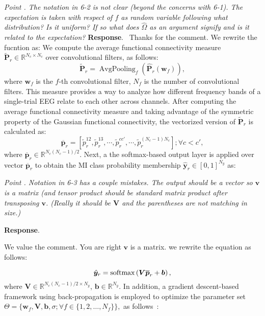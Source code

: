 \documentclass[runningheads]{llncs}
\newcommand{\Real}{\mathbb{R}}
\newcommand{\ve}[1]{\bm {#1}}
\newcommand{\mat}[1]{\bm {#1}}
\newenvironment{reviewer}{\setcounter{pointcounter}{1}}{}
\newcommand{\changes}[1]{\textcolor[rgb]{1.00,0.00,0.00}{#1}}
\newcommand{\point}[1]{\medskip \noindent
 \textsl{{\fontseries{b}\selectfont Point \thepointcounter}.
 \stepcounter{pointcounter} #1}}
\newcommand{\reply}{\medskip \noindent \textbf{Response}.\ }
\begin{document}
\begin{reviewer}
{\point{The notation in 6-2 is not clear (beyond the concerns with 6-1). The expectation is taken with respect of $f$ as random variable following what distribution? Is it uniform? If so what does $\hat{\Omega}$ as an argument signify and is it related to the expectation?}
\reply{
    Thanks for the comment. We rewrite the fucntion as:
    \changes{ We compute the average functional connectivity measure $\tilde{\mat{P}}_r \in \Real^{N_c \times N_c}$ over convolutional filters, as follows:
    \begin{equation}
		\tilde{\mat{P}}_r  = \operatorname{AvgPooling}_{f} \left(\hat{\mat{P}}_{r}(\ve{w}_f)\right), \label{eq:lastlayerFC}
	\end{equation}
    where $\ve{w}_f$ is the $f$-th convolutional filter, $N_f$ is the number of convolutional filters. This measure provides a way to analyze how different frequency bands of a single-trial EEG relate to each other across channels. After computing the average functional connectivity measure and taking advantage of the symmetric property of the Gaussian functional connectivity, the vectorized version of $\tilde{\mat{P}}_r$ is calculated as:
    \begin{equation} 
        \overline{\ve{p}}_r = \left[\tilde{p}_r^{12}, \tilde{p}_r^{13}, \cdots, \tilde{p}_r^{cc'}, \cdots, \tilde{p}_r^{(N_c-1) N_c} \right]; \forall c<c',
    \end{equation}
    where $\overline{\ve{p}}_r \in  \Real ^{N_c(N_c-1)/2}$. Next, a the softmax-based output layer is applied over vector $\overline{\ve{p}}_r$ to obtain the MI class probability membership $\hat{\ve{y}}_r \in [0,1]^{N_y}$ as:
    }
}

\point{Notation in 6-3 has a couple mistakes. The output should be a vector so $\mathbf{v}$ is a matrix (and tensor product should be standard matrix product after transposing $\mathbf{v}$. (Really it should be $\mathbf{V}$ and the parentheses are not matching in size.) }

\reply{
    We value the comment. You are right $\mathbf{v}$ is a matrix. we rewrite the equation as follows:

    \changes{
        \begin{equation}\label{eq:output}
            \hat{\ve{y}}_r = {\rm{softmax}}\left(\mat{V}\overline{\ve{p}}_r + \ve{b}\right),
        \end{equation}
        where $\mat{V}\in \Real^{N_c(N_c-1)/2\times N_y}$, $\ve{b} \in \Real^{N_y}$. In addition, a gradient descent-based framework using back-propagation is employed to optimize the parameter set $\Theta=\{\ve{w}_f,\mat{V},\ve{b},\sigma;\forall f\in\{1,2,\dots,N_f\}\},$ as follows~\cite{zhang2021dive}:
        }
}

}
\end{reviewer}
\end{document}
